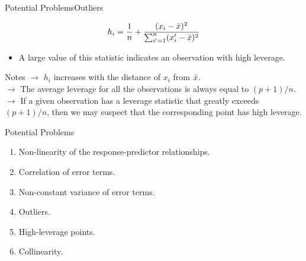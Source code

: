 \begin{frame}{Potential Problems}{Outliers}

$$h_i = \frac{1}{n} + \frac{(x_i - \Bar{x})^2}{\sum_{i'=1}^n (x_i' - \Bar{x})^2 }$$ \pause

\begin{itemize}

    \item A large value of this statistic indicates an observation with high leverage.
    
\end{itemize}

\begin{block}{Notes}
    $\rightarrow$ $h_i$ increases with the distance of $x_i$ from $\Bar{x}$. \pause  \\

    $\rightarrow$ The average leverage for all the observations is always equal to $(p + 1)/n$. \pause \\
    
    $\rightarrow$ If a given observation has a leverage statistic that greatly exceeds $(p+1)/n$, then we may suspect that the corresponding point has high leverage.   
\end{block}
    
    
\end{frame}


\begin{frame}[noframenumbering]{Potential Problems}


\begin{enumerate}
    \item<1> Non-linearity of the response-predictor relationships.
    \item<1> Correlation of error terms.
    \item<1> Non-constant variance of error terms.
    \item<1> Outliers.
    \item<1> High-leverage points.
    \item<1-2> Collinearity.
\end{enumerate}
    
\end{frame}

